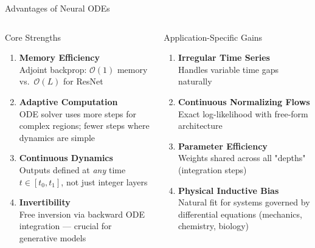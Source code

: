 \documentclass[aspectratio=169,xcolor=dvipsnames,svgnames,x11names,fleqn]{beamer}
\begin{document}
\begin{frame}{Advantages of Neural ODEs}
\scriptsize

\begin{columns}
\begin{tblockWing}{Core Strengths}
\begin{enumerate}
  \item[\faFlash] \textbf{Memory Efficiency}\\
    Adjoint backprop: $\mathcal{O}(1)$ memory vs.\ $\mathcal{O}(L)$ for ResNet
  \vspace{2pt}
  \item[\faFlash] \textbf{Adaptive Computation}\\
    ODE solver uses more steps for complex regions; fewer steps where dynamics are simple
  \vspace{2pt}
  \item[\faFlash] \textbf{Continuous Dynamics}\\
    Outputs defined at \emph{any} time $t \in [t_0, t_1]$, not just integer layers
  \vspace{2pt}
  \item[\faFlash] \textbf{Invertibility}\\
    Free inversion via backward ODE integration — crucial for generative models
\end{enumerate}
\end{tblockWing}
\begin{tblockWing}{Application-Specific Gains}
\begin{enumerate}
  \item[\faFlash] \textbf{Irregular Time Series}\\
    Handles variable time gaps naturally
  \vspace{2pt}
  \item[\faFlash] \textbf{Continuous Normalizing Flows}\\
    Exact log-likelihood with free-form architecture
  \vspace{2pt}
  \item[\faFlash] \textbf{Parameter Efficiency}\\
    Weights shared across all "depths" (integration steps)
  \vspace{2pt}
  \item[\faFlash] \textbf{Physical Inductive Bias}\\
    Natural fit for systems governed by differential equations (mechanics, chemistry, biology)
\end{enumerate}
\end{tblockWing}
\end{columns}
\end{frame}
 
\end{document}

